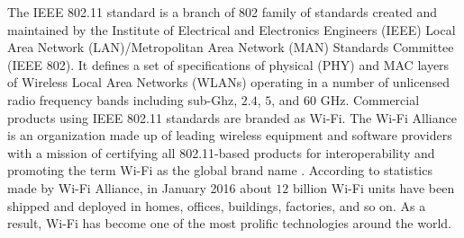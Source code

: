 The IEEE 802.11 standard is a branch of 802 family of standards created and maintained by the Institute of Electrical and Electronics Engineers (IEEE) Local Area Network (LAN)/Metropolitan Area Network (MAN) Standards Committee (IEEE 802). It defines a set of specifications of physical (PHY) and MAC layers of Wireless Local Area Networks (WLANs) operating in a number of unlicensed radio frequency bands including sub-Ghz, $2.4$, $5$, and $60$ GHz. Commercial products using IEEE 802.11 standards are branded as \mbox{Wi-Fi}. The \mbox{Wi-Fi} Alliance is an organization made up of leading wireless equipment and software providers with a mission of certifying all 802.11-based products for interoperability and promoting the term \mbox{Wi-Fi} as the global brand name \cite{wifi-alliance}. According to statistics made by \mbox{Wi-Fi} Alliance, in January 2016 about $12$ billion \mbox{Wi-Fi} units have been shipped and deployed in homes, offices, buildings, factories, and so on. As a result, \mbox{Wi-Fi} has become one of the most prolific technologies around the world. 

